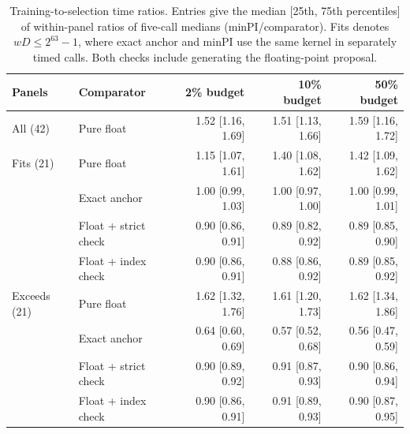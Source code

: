 \begin{table}[t]\centering\small
\caption{Training-to-selection time ratios. Entries give the median [25th, 75th percentiles] of within-panel ratios of five-call medians (minPI/comparator). Fits denotes $wD\le2^{63}-1$, where exact anchor and minPI use the same kernel in separately timed calls. Both checks include generating the floating-point proposal.}
\label{tab:crossbudget}\setlength{\tabcolsep}{2pt}
\begin{tabular*}{\linewidth}{@{\extracolsep{\fill}}llrrr@{}}\toprule
Panels & Comparator & 2\% budget & 10\% budget & 50\% budget\\\midrule
All (42) & Pure float & 1.52 [1.16, 1.69] & 1.51 [1.13, 1.66] & 1.59 [1.16, 1.72] \\
\addlinespace[2pt]
Fits (21) & Pure float & 1.15 [1.07, 1.61] & 1.40 [1.08, 1.62] & 1.42 [1.09, 1.62] \\
 & Exact anchor & 1.00 [0.99, 1.03] & 1.00 [0.97, 1.00] & 1.00 [0.99, 1.01] \\
 & Float + strict check & 0.90 [0.86, 0.91] & 0.89 [0.82, 0.92] & 0.89 [0.85, 0.90] \\
 & Float + index check & 0.90 [0.86, 0.91] & 0.88 [0.86, 0.92] & 0.89 [0.85, 0.92] \\
\addlinespace[2pt]
Exceeds (21) & Pure float & 1.62 [1.32, 1.76] & 1.61 [1.20, 1.73] & 1.62 [1.34, 1.86] \\
 & Exact anchor & 0.64 [0.60, 0.69] & 0.57 [0.52, 0.68] & 0.56 [0.47, 0.59] \\
 & Float + strict check & 0.90 [0.89, 0.92] & 0.91 [0.87, 0.93] & 0.90 [0.86, 0.94] \\
 & Float + index check & 0.90 [0.86, 0.91] & 0.91 [0.89, 0.93] & 0.90 [0.87, 0.95] \\
\bottomrule\end{tabular*}
\end{table}
